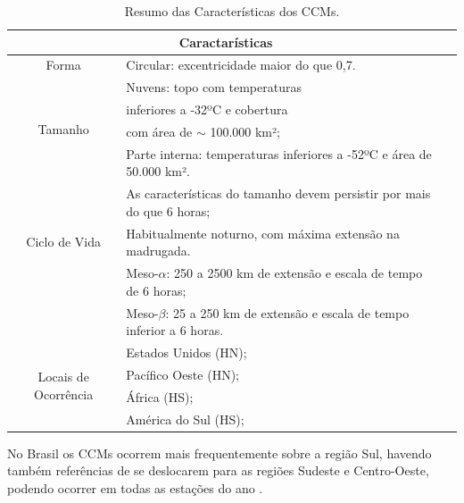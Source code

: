 \begin{table}
\caption{Resumo das Características dos CCMs.}
\label{tab01}
\centering
\begin{tabular}{c|p{12cm}l}
\hline
\multicolumn{2}{c}{Caractarísticas}                                                 \\
\hline
Forma                                       & Circular: excentricidade maior do que 0,7.\\
\hline
\multirow{4}{2cm}{Tamanho}                  & Nuvens: topo com temperaturas \\
                                            & inferiores a -32ºC e cobertura \\
                                            & com área de $\sim$ 100.000 km²; \\
                                            & Parte interna: temperaturas inferiores a -52ºC e área de 50.000 km².         \\
\hline
\multirow{3}{2cm}{Ciclo de Vida}            & As características do tamanho devem persistir por mais do que 6 horas;   \\
                                            & Habitualmente noturno, com máxima extensão na madrugada.                \\
\hline
\multirow{3}{2cm}{Escala}                   & Meso-$\alpha$: 250 a 2500 km de extensão e escala de tempo de 6 horas;      \\
                                            & Meso-$\beta$: 25 a 250 km de extensão e escala de tempo inferior a 6 horas. \\
\hline
\multirow{4}{2cm}{Locais de Ocorrência} & Estados Unidos (HN);                  \\
                                            & Pacífico Oeste (HN);              \\
                                            & África (HS);                      \\
                                            & América do Sul (HS);              \\
\hline
\end{tabular}
\end{table}

No Brasil os CCMs ocorrem mais frequentemente sobre a região Sul, havendo também referências de se deslocarem para as regiões Sudeste e Centro-Oeste, podendo ocorrer em todas as estações do ano \cite{silvadias96}.

